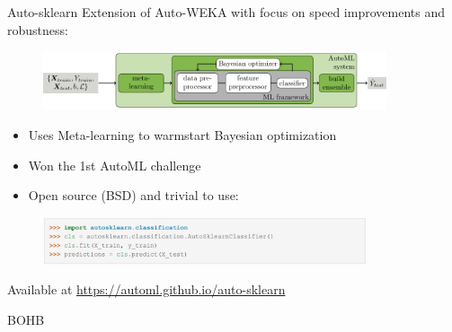 \begin{frame}[c]{Auto-sklearn}
Extension of Auto-WEKA with focus on speed improvements and robustness:
\begin{figure}
    \centering
    \includegraphics[width=0.9\textwidth]{images/success_stories/automlworkflow.pdf}
\end{figure}
\begin{itemize}
    \item Uses Meta-learning to warmstart Bayesian optimization
    \item Won the 1st AutoML challenge
    \item Open source (BSD) and trivial to use:
\end{itemize}
\begin{figure}
    \centering
    \includegraphics[width=0.85\textwidth]{images/success_stories/Auto-sklearn_01.png}
\end{figure}
Available at \url{https://automl.github.io/auto-sklearn}
\end{frame}

\begin{frame}[c]{BOHB}


\end{frame}

